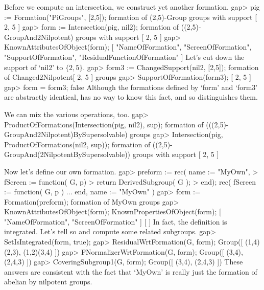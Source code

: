 Before we compute an intersection, we construct yet another formation.
\beginexample
gap> pig := Formation("PiGroups", [2,5]);
formation of (2,5)-Group groups with support [ 2, 5 ]
gap> form := Intersection(pig, nil2);
formation of ((2,5)-GroupAnd2Nilpotent) groups with support [ 2, 5 ]
gap> KnownAttributesOfObject(form);
[ "NameOfFormation", "ScreenOfFormation", "SupportOfFormation", 
  "ResidualFunctionOfFormation" ]
\endexample
 Let's cut down the support of `nil2' to $\{2,5\}$.
\beginexample
gap> form3 := ChangedSupport(nil2, [2,5]);
formation of Changed2Nilpotent[ 2, 5 ] groups
gap> SupportOfFormation(form3);
[ 2, 5 ]
gap> form = form3;
false
\endexample
Although the formations defined by `form' and `form3' are abstractly
identical, {\GAP} has no way to know this fact, and so distinguishes
them.

We can mix the various operations, too.
\beginexample
gap> ProductOfFormations(Intersection(pig, nil2), sup);
formation of (((2,5)-GroupAnd2Nilpotent)BySupersolvable) groups
gap> Intersection(pig, ProductOfFormations(nil2, sup));
formation of ((2,5)-GroupAnd(2NilpotentBySupersolvable)) groups with support 
[ 2, 5 ]
\endexample

  Now let's define our own formation.
\beginexample
gap> preform := rec( name := "MyOwn", 
>  fScreen := function( G, p)
>  return DerivedSubgroup( G );
>  end);
rec( fScreen := function( G, p ) ... end, name := "MyOwn" )
gap> form := Formation(preform);
formation of MyOwn groups
gap> KnownAttributesOfObject(form); KnownPropertiesOfObject(form);
[ "NameOfFormation", "ScreenOfFormation" ]
[  ]
\endexample
In fact, the definition is integrated. Let's tell {\GAP} so and compute
some related subgroups.
\beginexample
gap> SetIsIntegrated(form, true);
gap> ResidualWrtFormation(G, form);
Group([ (1,4)(2,3), (1,2)(3,4) ])
gap> FNormalizerWrtFormation(G, form);
Group([ (3,4), (2,4,3) ])
gap> CoveringSubgroup1(G, form);
Group([ (3,4), (2,4,3) ])
\endexample
These answers are consistent with the fact that `MyOwn' is really just the
formation of abelian by nilpotent groups.
